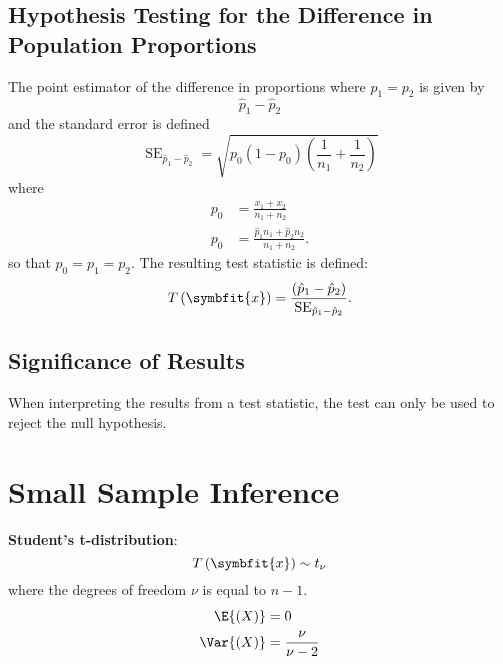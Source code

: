 \documentclass{article}
\begin{document}
\begin{multicols}{3}
\subsection{Hypothesis Testing for the Difference in Population Proportions}
The point estimator of the difference in proportions where \(p_1 = p_2\) is given by
\begin{equation*}
    \hat{p}_1 - \hat{p}_2
\end{equation*}
and the standard error is defined
\begin{equation*}
    \operatorname{SE}_{\hat{p}_1 - \hat{p}_2} = \sqrt{p_0 \left( 1 - p_0 \right) \left( \frac{1}{n_1} + \frac{1}{n_2} \right)}
\end{equation*}
where
\begin{align*}
    p_0 & = \frac{x_1 + x_2}{n_1 + n_2}                      \\
    p_0 & = \frac{\hat{p}_1 n_1 + \hat{p}_2 n_2}{n_1 + n_2}.
\end{align*}
so that \(p_0 = p_1 = p_2\).
The resulting test statistic is defined:
\begin{equation*}
    T\left( \symbfit{x} \right) = \frac{\left( \hat{p}_1 - \hat{p}_2 \right)}{\operatorname{SE}_{\hat{p}_1 - \hat{p}_2}}.
\end{equation*}
\subsection{Significance of Results}
When interpreting the results from a test statistic, the test can only be used to reject the null hypothesis.
\section{Small Sample Inference}
\textbf{Student's t-distribution}:
\begin{equation*}
    T\left( \symbfit{x} \right) \sim t_{\nu}
\end{equation*}
where the degrees of freedom \(\nu\) is equal to \(n - 1\).
\begin{align*}
    \E{\left( X \right)}   & = 0                   \\
    \Var{\left( X \right)} & = \frac{\nu}{\nu - 2} \\
\end{align*}

\end{multicols}
\end{document}
